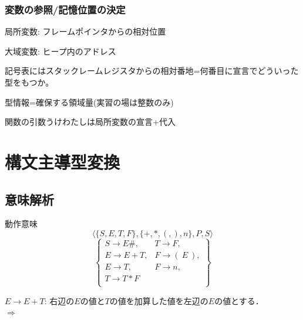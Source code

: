 \documentclass[dvipdfmx,cjk]{beamer}
\begin{document}
\begin{frame}
 \frametitle{変数の参照/記憶位置の決定}

 \begin{list}{}{}
  \item 局所変数: フレームポインタからの相対位置
  \item 大域変数: ヒープ内のアドレス\\
 \end{list}

 
 記号表にはスタックレームレジスタからの相対番地=何番目に宣言でどういった
 型をもつか。

 型情報=確保する領域量(実習の場は整数のみ)

 関数の引数うけわたしは局所変数の宣言+代入
	
\end{frame}

\section{構文主導型変換}

\subsection{意味解析}

\begin{frame}{動作意味}
\[\langle\{S,E,T,F\},\{+,\ast,(,),n\},P,S
  \rangle\]
  \[\left\{\begin{array}{ll}
    S\rightarrow E\#, & T\rightarrow F,\\
    E\rightarrow E+T, & F\rightarrow (\ E\ ),\\
    E\rightarrow T, & F\rightarrow n,\\
    T\rightarrow T\ast F & \\
  \end{array}\right\}\]

  \vspace*{3mm}


  \vspace*{3mm}

  $E\rightarrow E+T$: 右辺の$E$の値と$T$の値を加算した値を左辺の$E$の値とする．\\[3mm]
  $\Rightarrow$ 

\end{frame}
\end{document}
